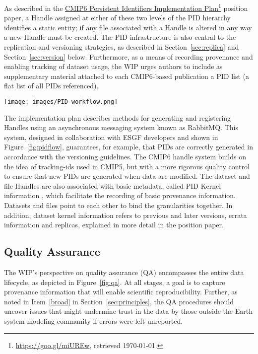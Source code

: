 \documentclass[gmd,manuscript]{copernicus}
\newcommand{\urlref}[2] {\href{#1}{#2}\footnote{\url{#1}, retrieved \today.}}
\begin{document}
As described in the \urlref{https://goo.gl/miUREw}{CMIP6 Persistent
  Identifiers Implementation Plan} position paper, a Handle assigned
at either of these two levels of the PID hierarchy identifies a static
entity; if any file associated with a Handle is altered in any way a
new Handle must be created. The PID infrastructure is also central to
the replication and versioning strategies, as described in
Section~\ref{sec:replica} and Section~\ref{sec:version} below. Furthermore, as a
means of recording provenance and enabling tracking of dataset usage,
the WIP urges authors to include as supplementary material attached to
each CMIP6-based publication a PID list (a flat list of all PIDs
referenced).

\begin{figure*}
  \begin{center}
    \texttt{[image: images/PID-workflow.png]}
  \end{center}
  \caption{PID workflow, showing the generation and registry of PIDs,
    with checkpoints where compliance is assured.}
  \label{fig:pidflow}
\end{figure*}

The implementation plan describes methods for generating and
registering Handles using an asynchronous messaging system known as
RabbitMQ. This system, designed in collaboration with ESGF developers
and shown in Figure~\ref{fig:pidflow}, guarantees, for example, that PIDs are
correctly generated in accordance with the versioning guidelines. The
CMIP6 handle system builds on the idea of tracking-ids used in CMIP5,
but with a more rigorous quality control to ensure that new PIDs are
generated when data are modified. The dataset and file Handles are
also associated with basic metadata, called PID Kernel information
\citep{ref:zhouetal2018}, which facilitate the recording of basic
provenance information. Datasets and files point to each other to bind
the granularities together. In addition, dataset kernel information
refers to previous and later versions, errata information and
replicas, explained in more detail in the position paper.

\subsection{Quality Assurance}
\label{sec:qa}

The WIP's perspective on quality assurance (QA) encompasses the entire
data lifecycle, as depicted in Figure~\ref{fig:qa}. At all stages, a goal is
to capture provenance information that will enable scientific
reproducibility. Further, as noted in Item~\ref{broad} in
Section~\ref{sec:principles}, the QA procedures should uncover issues that
might undermine trust in the data by those outside the Earth system
modeling community if errors were left unreported.
\end{document}
